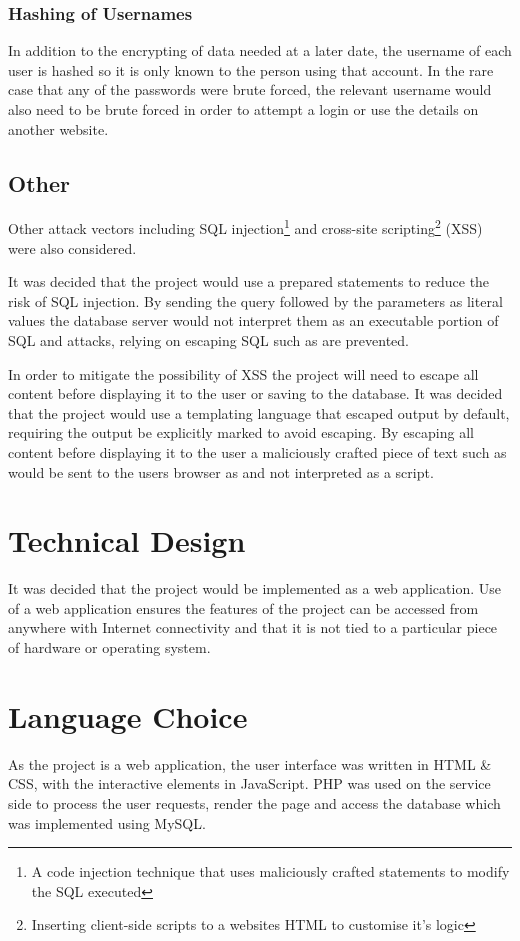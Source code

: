 \subsubsection{Hashing of Usernames}
In addition to the encrypting of data needed at a later date, the username of each user is hashed so it is only known to the person using that account. In the rare case that any of the passwords were brute forced, the relevant username would also need to be brute forced in order to attempt a login or use the details on another website.

\subsection{Other} \label{subsection:securityother}
Other attack vectors including SQL injection\footnote{A code injection technique that uses maliciously crafted statements to modify the SQL executed} and cross-site scripting\footnote{Inserting client-side scripts to a websites HTML to customise it's logic} (XSS) were also considered.

It was decided that the project would use a prepared statements to reduce the risk of SQL injection. By sending the query followed by the parameters as literal values the database server would not interpret them as an executable portion of SQL and attacks, relying on escaping SQL such as  are prevented.

In order to mitigate the possibility of XSS the project will need to escape all content before displaying it to the user or saving to the database. It was decided that the project would use a templating language that escaped output by default, requiring the output be explicitly marked to avoid escaping.
%
By escaping all content before displaying it to the user a maliciously crafted piece of text such as  would be sent to the users browser as  and not interpreted as a script.

\section{Technical Design}
It was decided that the project would be implemented as a web application. Use of a web application ensures the features of the project can be accessed from anywhere with Internet connectivity and that it is not tied to a particular piece of hardware or operating system.

\section{Language Choice}
As the project is a web application, the user interface was written in HTML \& CSS, with the interactive elements in JavaScript. PHP was used on the service side to process the user requests, render the page and access the database which was implemented using MySQL.
 
